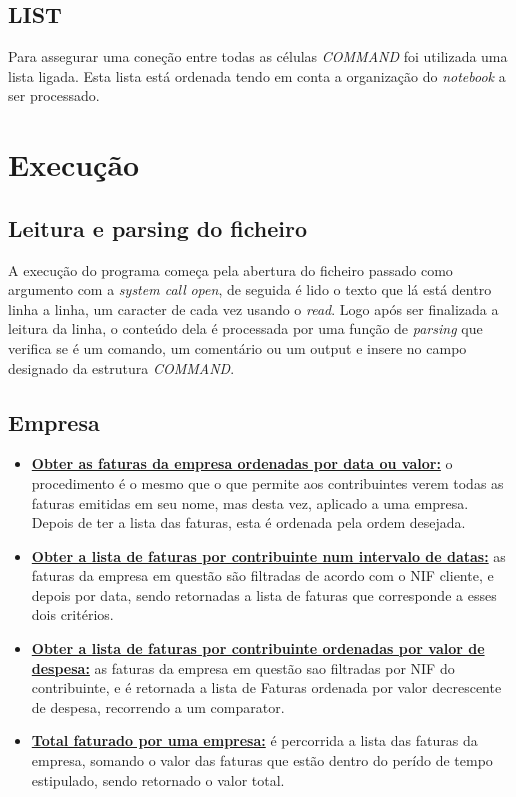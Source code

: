 \subsection{LIST}

Para assegurar uma coneção entre todas as células \textit{COMMAND} foi utilizada uma lista ligada. Esta lista está ordenada tendo em conta a organização do \textit{\textit{notebook}} a ser processado.


\section{Execução}

\subsection{Leitura e parsing do ficheiro}
A execução do programa começa pela abertura do ficheiro passado como argumento com a \textit{system call} \textit{\textit{open}}, de seguida é lido o texto que lá está dentro linha a linha, um caracter de cada vez usando o \textit{\textit{read}}. Logo após ser finalizada a leitura da linha, o conteúdo dela é processada por uma função de \textit{parsing} que verifica se é um comando, um comentário ou um output e insere no campo designado da estrutura \textit{COMMAND}.

\subsection{Empresa}
\begin{itemize}
\item \textbf{\underline{Obter as faturas da empresa ordenadas por data ou valor:}} o procedimento é o mesmo que o que permite aos contribuintes verem todas as faturas emitidas em seu nome, mas desta vez, aplicado a uma empresa. Depois de ter a lista das faturas, esta é ordenada pela ordem desejada.
\item \textbf{\underline{Obter a lista de faturas por contribuinte num intervalo de datas:}} as faturas da empresa em questão são filtradas de acordo com o NIF cliente, e depois por data, sendo retornadas a lista de faturas que corresponde a esses dois critérios.
\item \textbf{\underline{Obter a lista de faturas por contribuinte ordenadas por valor de despesa:}} as faturas da empresa em questão sao filtradas por NIF do contribuinte, e é retornada a lista de Faturas ordenada por valor decrescente de despesa, recorrendo a um comparator.
\item \textbf{\underline{Total faturado por uma empresa:}} é percorrida a lista das faturas da empresa, somando o valor das faturas que estão dentro do perído de tempo estipulado, sendo retornado o valor total.
\end{itemize}

